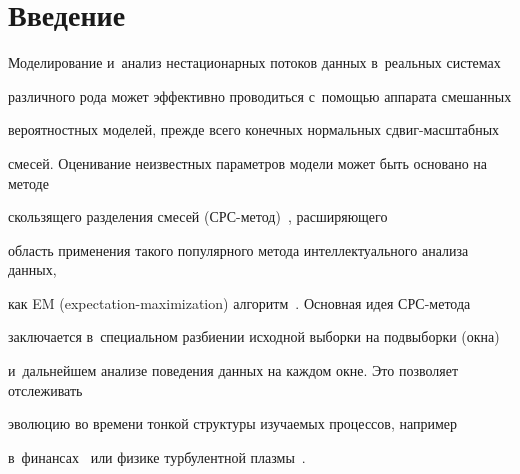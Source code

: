 















      \thispagestyle{headings}


      


      \vspace*{-14pt} 








\section{Введение}





  \vspace*{-3pt}





Моделирование и~анализ нестационарных потоков данных в~реальных сис\-те\-мах 


различного рода может эффективно проводиться с~помощью аппарата смешанных 


вероятностных моделей, прежде всего конечных нормальных сдвиг-мас\-штаб\-ных 


смесей. Оценивание неизвестных параметров модели может быть основано на методе 


скользящего разделения смесей (СРС-ме\-тод)~\cite{Korolev2011}, рас\-ши\-ря\-юще\-го 


область применения такого популярного метода интеллектуального анализа данных, 


как EM (expectation-maximization) алгоритм~\cite{Wu2008,Yang2012,Lee2012}. Основная идея СРС-ме\-то\-да 


заключается в~специальном разбиении исходной выборки на подвыборки (окна) 


и~дальнейшем анализе поведения данных на каждом окне. Это позволяет отслеживать 


эволюцию во времени тонкой структуры изучаемых процессов, например 


в~финансах~\cite{Gorshenin2008} или физике турбулентной плазмы~\cite{Gorshenin2012}. 





